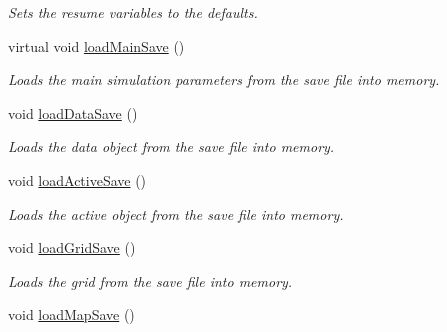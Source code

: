 \begin{DoxyCompactItemize}
\begin{DoxyCompactList}\small\item\em Sets the resume variables to the defaults. \end{DoxyCompactList}\item 
virtual void \hyperlink{class_tree_af57075728924141c7b6d311822a22dc0}{load\+Main\+Save} ()\hypertarget{class_tree_af57075728924141c7b6d311822a22dc0}{}\label{class_tree_af57075728924141c7b6d311822a22dc0}

\begin{DoxyCompactList}\small\item\em Loads the main simulation parameters from the save file into memory. \end{DoxyCompactList}\item 
void \hyperlink{class_tree_af7db53d4870d845741d3159f57b73b30}{load\+Data\+Save} ()\hypertarget{class_tree_af7db53d4870d845741d3159f57b73b30}{}\label{class_tree_af7db53d4870d845741d3159f57b73b30}

\begin{DoxyCompactList}\small\item\em Loads the data object from the save file into memory. \end{DoxyCompactList}\item 
void \hyperlink{class_tree_af145148202f11654d6d6a15a6c021924}{load\+Active\+Save} ()\hypertarget{class_tree_af145148202f11654d6d6a15a6c021924}{}\label{class_tree_af145148202f11654d6d6a15a6c021924}

\begin{DoxyCompactList}\small\item\em Loads the active object from the save file into memory. \end{DoxyCompactList}\item 
void \hyperlink{class_tree_a2834ef82f447ca95c48310538c4b56ed}{load\+Grid\+Save} ()\hypertarget{class_tree_a2834ef82f447ca95c48310538c4b56ed}{}\label{class_tree_a2834ef82f447ca95c48310538c4b56ed}

\begin{DoxyCompactList}\small\item\em Loads the grid from the save file into memory. \end{DoxyCompactList}\item 
void \hyperlink{class_tree_a1d8d885f6db073e2b2fe8f58023f764f}{load\+Map\+Save} ()\hypertarget{class_tree_a1d8d885f6db073e2b2fe8f58023f764f}{}\label{class_tree_a1d8d885f6db073e2b2fe8f58023f764f}


\end{DoxyCompactItemize}

